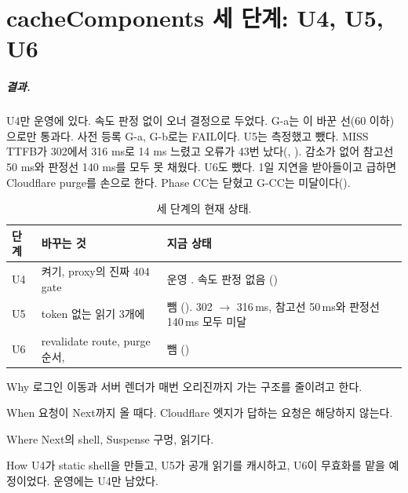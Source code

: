 \chapter{cacheComponents 세 단계: U4, U5, U6}\label{ch:cc3}

\paragraph{결과.}
U4만 운영에 있다. 속도 판정 없이 오너 결정으로 두었다. G-a는 이 바꾼 선(60 이하)으로만 통과다. 사전 등록 G-a, G-b로는 FAIL이다.
U5는 측정했고 뺐다. MISS TTFB가 302에서 316 ms로 14 ms 느렸고  오류가 43번 났다(, ). 감소가 없어 참고선 50 ms와  판정선 140 ms를 모두 못 채웠다.
U6도 뺐다. 1일 지연을 받아들이고 급하면 Cloudflare purge를 손으로 한다.
Phase CC는 닫혔고 G-CC는 미달이다().

\begin{table}[H]
  \caption{세 단계의 현재 상태.}
  \label{tab:cc3-state}
  \centering\small
  \begin{tabularx}{\linewidth}{@{}L{1.2cm} Y L{4.2cm}@{}}
    \toprule
    단계 & 바꾸는 것 & 지금 상태 \\
    \midrule
    U4 &  켜기, proxy의 진짜 404 gate & 운영 . 속도 판정 없음 () \\
    \midrule
    U5 & token 없는 읽기 3개에  & 뺌 (). 302 $\to$ 316\,ms, 참고선 50\,ms와 판정선 140\,ms 모두 미달 \\
    \midrule
    U6 & revalidate route, purge 순서,  & 뺌 () \\
    \bottomrule
  \end{tabularx}
\end{table}

\begin{inbrief}
  \item[Why] 로그인 이동과 서버 렌더가 매번 오리진까지 가는 구조를 줄이려고 한다.
  \item[When] 요청이 Next까지 올 때다. Cloudflare 엣지가 답하는 요청은 해당하지 않는다.
  \item[Where] Next의 shell, Suspense 구멍,  읽기다.
  \item[How] U4가 static shell을 만들고, U5가 공개 읽기를 캐시하고, U6이 무효화를 맡을 예정이었다. 운영에는 U4만 남았다.
\end{inbrief}

